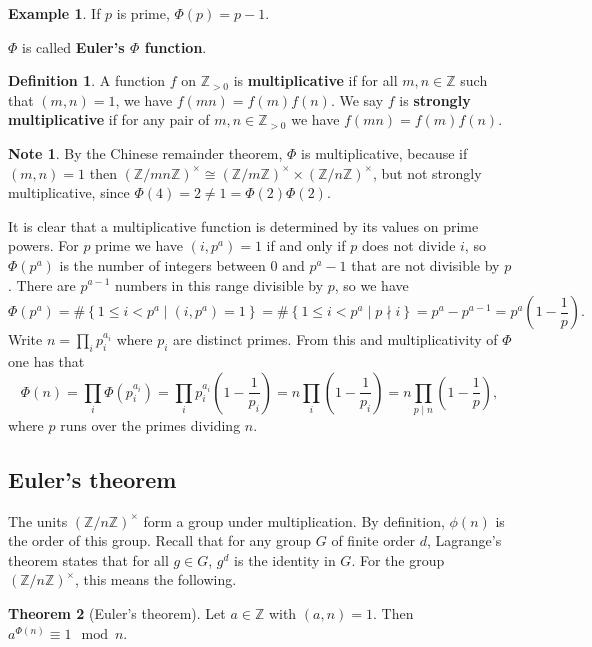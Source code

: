 \documentclass{article}
\newcommand{\Z}{\mathbb{Z}}
\newcommand{\rb}[1]{\left( #1 \right)}
\newcommand{\cb}[1]{\left\{ #1 \right\}}
\newcommand{\unit}[1]{\rb{\Z / #1\Z}^\times}
\theoremstyle{definition}\newtheorem{definition}{Definition}
\theoremstyle{definition}\newtheorem{remark}[definition]{Remark}
\theoremstyle{definition}\newtheorem*{example}{Example}
\theoremstyle{definition}\newtheorem*{note}{Note}
\newtheorem{theorem}[definition]{Theorem}
\begin{document}
\begin{example}
If $ p $ is prime, $ \Phi\rb{p} = p - 1 $.
\end{example}

$ \Phi $ is called \textbf{Euler's $ \Phi $ function}.

\begin{definition}
A function $ f $ on $ \Z_{> 0} $ is \textbf{multiplicative} if for all $ m, n \in \Z $ such that $ \rb{m, n} = 1 $, we have $ f\rb{mn} = f\rb{m}f\rb{n} $. We say $ f $ is \textbf{strongly multiplicative} if for any pair of $ m, n \in \Z_{> 0} $ we have $ f\rb{mn} = f\rb{m}f\rb{n} $.
\end{definition}

\begin{note}
By the Chinese remainder theorem, $ \Phi $ is multiplicative, because if $ \rb{m, n} = 1 $ then $ \unit{mn} \cong \unit{m} \times \unit{n} $, but not strongly multiplicative, since $ \Phi\rb{4} = 2 \ne 1 = \Phi\rb{2}\Phi\rb{2} $.
\end{note}

It is clear that a multiplicative function is determined by its values on prime powers. For $ p $ prime we have $ \rb{i, p^a} = 1 $ if and only if $ p $ does not divide $ i $, so $ \Phi\rb{p^a} $ is the number of integers between $ 0 $ and $ p^a - 1 $ that are not divisible by $ p $. There are $ p^{a - 1} $ numbers in this range divisible by $ p $, so we have
$$ \Phi\rb{p^a} = \#\cb{1 \le i < p^a \mid \rb{i, p^a} = 1} = \#\cb{1 \le i < p^a \mid p \nmid i} = p^a - p^{a - 1} = p^a\rb{1 - \dfrac{1}{p}}. $$
Write $ n = \prod_i p_i^{a_i} $ where $ p_i $ are distinct primes. From this and multiplicativity of $ \Phi $ one has that
$$ \Phi\rb{n} = \prod_i \Phi\rb{p_i^{a_i}} = \prod_i p_i^{a_i}\rb{1 - \dfrac{1}{p_i}} = n\prod_i \rb{1 - \dfrac{1}{p_i}} = n\prod_{p \mid n} \rb{1 - \dfrac{1}{p}}, $$
where $ p $ runs over the primes dividing $ n $.

\subsection{Euler's theorem}

The units $ \unit{n} $ form a group under multiplication. By definition, $ \phi\rb{n} $ is the order of this group. Recall that for any group $ G $ of finite order $ d $, Lagrange's theorem states that for all $ g \in G $, $ g^d $ is the identity in $ G $. For the group $ \unit{n} $, this means the following.

\begin{theorem}[Euler's theorem]
\label{thm:16}
Let $ a \in \Z $ with $ \rb{a, n} = 1 $. Then $ a^{\Phi\rb{n}} \equiv 1 \mod n $.
\end{theorem}
\end{document}
